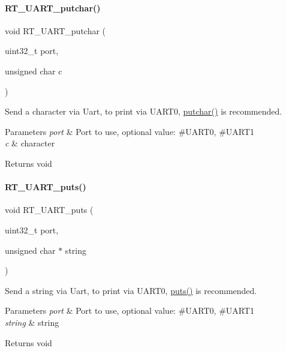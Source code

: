 \paragraph{\texorpdfstring{R\+T\+\_\+\+U\+A\+R\+T\+\_\+putchar()}{RT\_UART\_putchar()}}
{\footnotesize\ttfamily void R\+T\+\_\+\+U\+A\+R\+T\+\_\+putchar (\begin{DoxyParamCaption}\item[{uint32\+\_\+t}]{port,  }\item[{unsigned char}]{c }\end{DoxyParamCaption})}



Send a character via Uart, to print via U\+A\+R\+T0, \mbox{\hyperlink{a00026_a948b7a0779c308ac5502c57e282e6933}{putchar()}} is recommended. 


\begin{DoxyParams}{Parameters}
{\em port} & Port to use, optional value\+: \#\+U\+A\+R\+T0, \#\+U\+A\+R\+T1 \\
\hline
{\em c} & character \\
\hline
\end{DoxyParams}
\begin{DoxyReturn}{Returns}
void 
\end{DoxyReturn}
\mbox{\label{a00056_ad61c03a00ccd43875563c16f97d61af7}} 
\paragraph{\texorpdfstring{R\+T\+\_\+\+U\+A\+R\+T\+\_\+puts()}{RT\_UART\_puts()}}
{\footnotesize\ttfamily void R\+T\+\_\+\+U\+A\+R\+T\+\_\+puts (\begin{DoxyParamCaption}\item[{uint32\+\_\+t}]{port,  }\item[{unsigned char $\ast$}]{string }\end{DoxyParamCaption})}



Send a string via Uart, to print via U\+A\+R\+T0, \mbox{\hyperlink{a00026_a46036bd75b920766eef64eb7910c887d}{puts()}} is recommended. 


\begin{DoxyParams}{Parameters}
{\em port} & Port to use, optional value\+: \#\+U\+A\+R\+T0, \#\+U\+A\+R\+T1 \\
\hline
{\em string} & string \\
\hline
\end{DoxyParams}
\begin{DoxyReturn}{Returns}
void 
\end{DoxyReturn}
